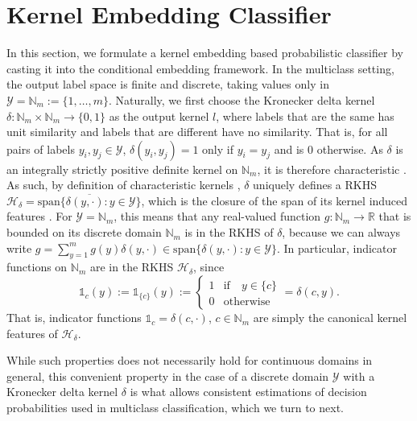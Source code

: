 \documentclass{article}
\begin{document}
\section{Kernel Embedding Classifier}
\label{sec:kernel_embedding_classifier}

	In this section, we formulate a kernel embedding based probabilistic classifier by casting it into the conditional embedding framework. In the multiclass setting, the output label space is finite and discrete, taking values only in $\mathcal{Y} = \mathbb{N}_{m} := \{1, \dots, m\}$. Naturally, we first choose the Kronecker delta kernel $\delta : \mathbb{N}_{m} \times \mathbb{N}_{m} \to \{0, 1\}$ as the output kernel $l$, where labels that are the same has unit similarity and labels that are different have no similarity. That is, for all pairs of labels $y_{i}, y_{j} \in \mathcal{Y}$, $\delta(y_{i}, y_{j}) = 1$ only if $y_{i} = y_{j}$ and is $0$ otherwise. As $\delta$ is an integrally strictly positive definite kernel on $\mathbb{N}_{m}$, it is therefore characteristic \citep[Theorem 7]{sriperumbudur2010hilbert}. As such, by definition of characteristic kernels \citep{fukumizu2004dimensionality}, $\delta$ uniquely defines a RKHS  $\mathcal{H}_{\delta} = \overline{\mathrm{span}\{\delta(y, \cdot) : y \in \mathcal{Y}\}}$, which is the closure of the span of its kernel induced features \citep{xu2009refinement}. For $\mathcal{Y} = \mathbb{N}_{m}$, this means that any real-valued function $g : \mathbb{N}_{m} \to \mathbb{R}$ that is bounded on its discrete domain $\mathbb{N}_{m}$ is in the RKHS of $\delta$, because we can always write $g = \sum_{y = 1}^{m} g(y) \delta(y, \cdot) \in \mathrm{span}\{\delta(y, \cdot) : y \in \mathcal{Y}\}$. In particular, indicator functions on $\mathbb{N}_{m}$ are in the RKHS $\mathcal{H}_{\delta}$, since
	\begin{equation}
		\mathbb{1}_{c}(y) := \mathbb{1}_{\{c\}}(y) := \begin{cases}
		1 & \mathrm{if } \quad y \in \{c\} \\
		0 & \mathrm{otherwise}
		\end{cases} = \delta(c, y).
	\label{eq:indicator_function}
	\end{equation}
	That is, indicator functions $\mathbb{1}_{c} = \delta(c, \cdot)$, $c \in \mathbb{N}_{m}$ are simply the canonical kernel features of $\mathcal{H}_{\delta}$. 
	
	While such properties does not necessarily hold for continuous domains in general, this convenient property in the case of a discrete domain $\mathcal{Y}$ with a Kronecker delta kernel $\delta$ is what allows consistent estimations of decision probabilities used in multiclass classification, which we turn to next.
	
\end{document}
